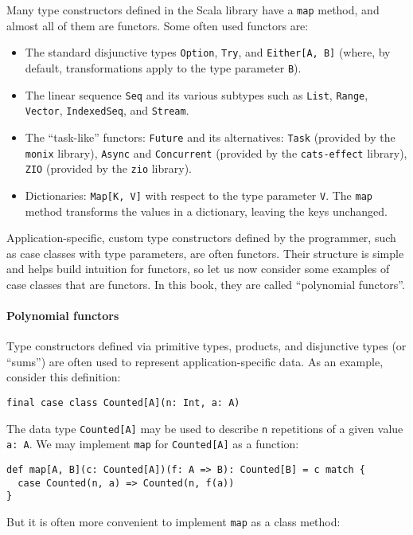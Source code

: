 Many type constructors defined in the Scala library have a \lstinline!map!
method, and almost all of them are functors. Some often used functors
are:
\begin{itemize}
\item The standard disjunctive types \lstinline!Option!, \lstinline!Try!,
and \lstinline!Either[A, B]! (where, by default, transformations
apply to the type parameter \lstinline!B!).
\item The linear sequence \lstinline!Seq! and its various subtypes such
as \lstinline!List!, \lstinline!Range!, \lstinline!Vector!, \lstinline!IndexedSeq!,
and \lstinline!Stream!.
\item The \textsf{``}task-like\textsf{''} functors: \lstinline!Future! and its alternatives:
\lstinline!Task! (provided by the \texttt{monix} library), \lstinline!Async!
and \lstinline!Concurrent! (provided by the \texttt{cats-effect}
library), \lstinline!ZIO! (provided by the \texttt{zio} library).
\item Dictionaries: \lstinline!Map[K, V]! with respect to the type parameter
\lstinline!V!. The \lstinline!map! method transforms the values
in a dictionary, leaving the keys unchanged.
\end{itemize}
Application-specific, custom type constructors defined by the programmer,
such as case classes with type parameters, are often functors. Their
structure is simple and helps build intuition for functors, so let
us now consider some examples of case classes that are functors. In
this book, they are called \textsf{``}polynomial functors\textsf{''}.

\paragraph{Polynomial functors}

Type constructors defined
via primitive types, products, and disjunctive types (or \textsf{``}sums\textsf{''})
are often used to represent application-specific data. As an example,
consider this definition:
\begin{lstlisting}
final case class Counted[A](n: Int, a: A)
\end{lstlisting}
The data type \lstinline!Counted[A]! may be used to describe \lstinline!n!
repetitions of a given value \lstinline!a: A!. We may implement \lstinline!map!
for \lstinline!Counted[A]! as a function:
\begin{lstlisting}
def map[A, B](c: Counted[A])(f: A => B): Counted[B] = c match {
  case Counted(n, a) => Counted(n, f(a))
}
\end{lstlisting}
But it is often more convenient to implement \lstinline!map! as a
class method:


